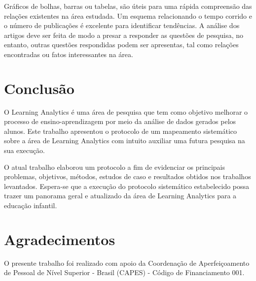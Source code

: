 \documentclass[12pt]{article}
\begin{document}
Gráficos de bolhas, barras ou tabelas, são úteis para uma rápida compreensão das relações existentes na área estudada. Um esquema relacionando o tempo corrido e o número de publicações é excelente para identificar tendências. A análise dos artigos deve ser feita de modo a presar a responder as questões de pesquisa, no entanto, outras questões respondidas podem ser apresentas, tal como relações encontradas ou fatos interessantes na área.


\section{Conclusão}\label{secao:conclusao}

O Learning Analytics é uma área de pesquisa que tem como objetivo melhorar o processo de ensino-aprendizagem por meio da análise de dados gerados pelos alunos. Este trabalho apresentou o protocolo de um mapeamento sistemático sobre a área de Learning Analytics com intuito auxiliar uma futura pesquisa na sua execução. 

O atual trabalho elaborou um protocolo a fim de evidenciar os principais problemas, objetivos, métodos, estudos de caso e resultados obtidos nos trabalhos levantados. Espera-se que a execução do protocolo sistemático estabelecido possa trazer um panorama geral e atualizado da área de Learning Analytics para a educação infantil. 


\section*{Agradecimentos}\label{secao:agradecimentos}

O presente trabalho foi realizado com apoio da Coordenação de Aperfeiçoamento de Pessoal de Nível Superior - Brasil (CAPES) - Código de Financiamento 001.

%

\end{document}
